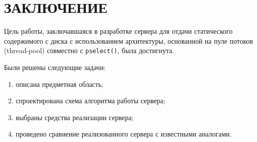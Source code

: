 \chapter*{ЗАКЛЮЧЕНИЕ}

Цель работы, заключавшаяся в разработке сервера для отдачи статического содержимого с диска с использованием архитектуры, основанной на пуле потоков (thread-pool) совместно с \texttt{pselect()}, была достигнута.

Были решены следующие задачи:
\begin{enumerate}[leftmargin=1.6\parindent]
	\item описана предметная область;
	\item спроектирована схема алгоритма работы сервера;
	\item выбраны средства реализации сервера;
	\item проведено сравнение реализованного сервера с известными аналогами.
\end{enumerate}